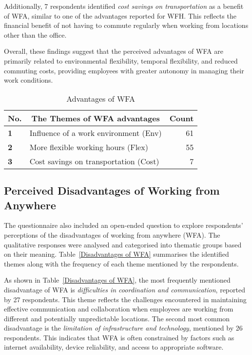 \documentclass[a4paper, conference]{IEEEtran}
\begin{document}
Additionally, 7 respondents identified \textit{cost savings on transportation} as a benefit of WFA, similar to one of the advantages reported for WFH. This reflects the financial benefit of not having to commute regularly when working from locations other than the office.

Overall, these findings suggest that the perceived advantages of WFA are primarily related to environmental flexibility, temporal flexibility, and reduced commuting costs, providing employees with greater autonomy in managing their work conditions.

\begin{table}
	\centering
	\caption{Advantages of WFA}
	\label{Advantages of WFA}
	\begin{tabular}{|p{}|p{}|r|}
		\hline
		\multicolumn{1}{|c|}{\textbf{No.}} & \multicolumn{1}{c|}{\textbf{The Themes of WFA advantages}} & \multicolumn{1}{c|}{\textbf{Count}} \\ \hline
		\textbf{1} & Influence of a work environment (Env) & 61 %
		\\ \hline
		\textbf{2} &  More flexible working hours (Flex)       & 55 %
		\\ \hline
		\textbf{3} & Cost savings on transportation (Cost)      & 7 %
		\\ \hline
	\end{tabular}
\end{table}


\subsection{Perceived Disadvantages of Working from Anywhere}
\label{sec:disadvantage-wfa}

The questionnaire also included an open-ended question to explore respondents' perceptions of the disadvantages of working from anywhere (WFA). The qualitative responses were analysed and categorised into thematic groups based on their meaning. Table~\ref{Disadvantages of WFA} summarises the identified themes along with the frequency of each theme mentioned by the respondents.

As shown in Table~\ref{Disadvantages of WFA}, the most frequently mentioned disadvantage of WFA is \textit{difficulties in coordination and communication}, reported by 27 respondents. This theme reflects the challenges encountered in maintaining effective communication and collaboration when employees are working from different and potentially unpredictable locations. The second most common disadvantage is the \textit{limitation of infrastructure and technology}, mentioned by 26 respondents. This indicates that WFA is often constrained by factors such as internet availability, device reliability, and access to appropriate software.
\end{document}
